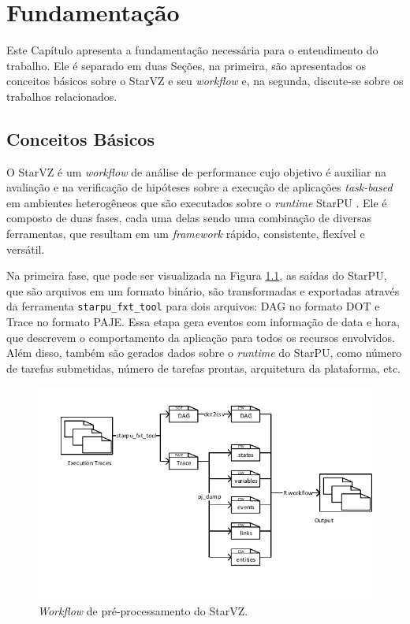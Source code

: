 
\chapter{Fundamentação} \label{ch:fundamentation}

Este Capítulo apresenta a fundamentação necessária para o entendimento do trabalho. 
Ele é separado em duas Seções, na primeira, são apresentados os conceitos básicos 
sobre o StarVZ e seu \emph{workflow} e, na segunda, discute-se sobre os trabalhos 
relacionados.

\section{Conceitos Básicos} \label{sect:basic-concepts}

O StarVZ \cite{ref:starvz} é um \emph{workflow} de análise de performance cujo 
objetivo é auxiliar na avaliação e na verificação de hipóteses sobre a execução de 
aplicações \emph{task-based} em ambientes heterogêneos que são executados sobre o
\emph{runtime} StarPU \cite{ref:starpu}. Ele é composto de duas fases, cada uma 
delas sendo uma combinação de diversas ferramentas, que resultam em um \emph{framework}
rápido, consistente, flexível e versátil.

Na primeira fase, que pode ser visualizada na Figura \ref{fig:starvz-workflow1}, as 
saídas do StarPU, que são arquivos em um formato binário, são transformadas e exportadas
através da ferramenta \texttt{starpu\_fxt\_tool} para dois arquivos: DAG no formato DOT 
e Trace no formato PAJE. Essa etapa gera eventos com informação de data e hora, que 
descrevem o comportamento da aplicação para todos os recursos envolvidos. Além disso, 
também são gerados dados sobre o \emph{runtime} do StarPU, como número de tarefas submetidas,
número de tarefas prontas, arquitetura da plataforma, etc.

\begin{figure}[h]
 \centerline{\includegraphics[width=1\textwidth]{./img/step1-final.pdf}}
 \caption{\emph{Workflow} de pré-processamento do StarVZ.}
 \label{fig:starvz-workflow1}
\end{figure}

